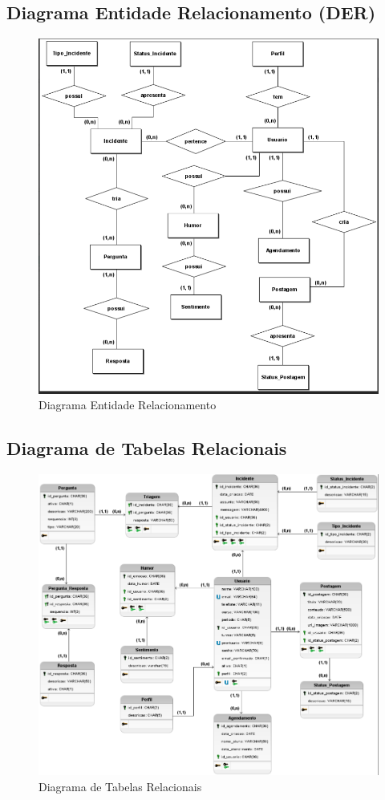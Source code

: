 \documentclass[12pt,a4paper]{article}
\begin{document}
\subsection{Diagrama Entidade Relacionamento (DER)}
\begin{figure}[H]
    \centering
     \includegraphics[width=15cm]{der.png}
    \caption{Diagrama Entidade Relacionamento}
    \label{der}
\end{figure}

\newpage

\subsection{Diagrama de Tabelas Relacionais}
\begin{figure}[H]
    \centering
     \includegraphics[width=15cm]{mer.png}
    \caption{Diagrama de Tabelas Relacionais}
    \label{mer}
\end{figure}
\end{document}

